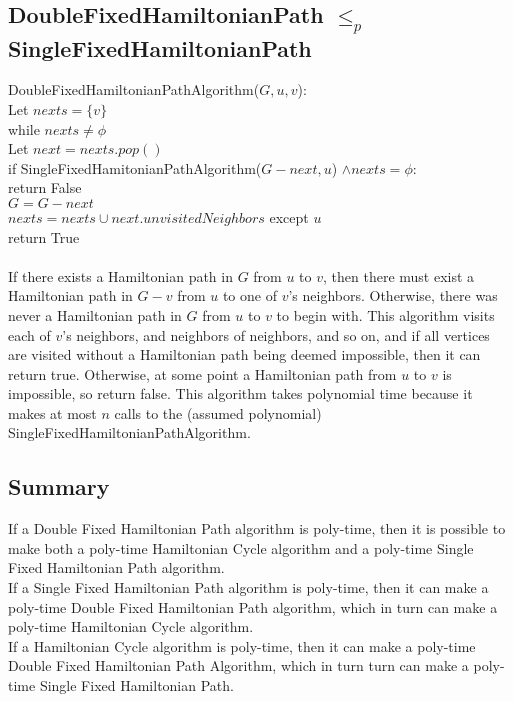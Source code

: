\documentclass[letterpaper,notitlepage,twoside]{article}
\newcommand{\union}{\cup}
\newcommand\tab[1][1cm]{\hspace*{#1}} %
\begin{document}
\subsection*{DoubleFixedHamiltonianPath $\leq_p$ SingleFixedHamiltonianPath}
DoubleFixedHamiltonianPathAlgorithm($G, u, v$):\\
\tab Let $nexts = \{v\}$\\
\tab while $nexts \neq \phi$ \\
\tab\tab Let $next = nexts.pop()$ \\
\tab\tab if SingleFixedHamitonianPathAlgorithm($G - next, u$) $\land nexts = \phi$:\\
\tab\tab\tab return False\\
\tab\tab $G = G - next$\\
\tab\tab $nexts = nexts \union next.unvisitedNeighbors$ except $u$\\
\tab return True
\\\\
If there exists a Hamiltonian path in $G$ from $u$ to $v$, then there must exist a Hamiltonian path in $G - v$ from $u$ to one of $v$'s neighbors. Otherwise, there was never a Hamiltonian path in $G$ from $u$ to $v$ to begin with. This algorithm visits each of $v$'s neighbors, and neighbors of neighbors, and so on, and if all vertices are visited without a Hamiltonian path being deemed impossible, then it can return true. Otherwise, at some point a Hamiltonian path from $u$ to $v$ is impossible, so return false. This algorithm takes polynomial time because it makes at most $n$ calls to the (assumed polynomial) SingleFixedHamiltonianPathAlgorithm.

\subsection*{Summary}
If a Double Fixed Hamiltonian Path algorithm is poly-time, then it is possible to make both a poly-time Hamiltonian Cycle algorithm and a poly-time Single Fixed Hamiltonian Path algorithm.\\
If a Single Fixed Hamiltonian Path algorithm is poly-time, then it can make a poly-time Double Fixed Hamiltonian Path algorithm, which in turn can make a poly-time Hamiltonian Cycle algorithm. \\
If a Hamiltonian Cycle algorithm is poly-time, then it can make a poly-time Double Fixed Hamiltonian Path Algorithm, which in turn turn can make a poly-time Single Fixed Hamiltonian Path.
\end{document}
